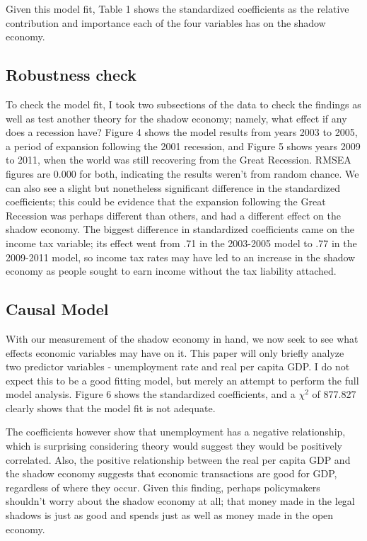 \documentclass[12pt]{report}
\begin{document}
Given this model fit, Table 1 shows the standardized coefficients as the relative contribution and importance each of the four variables has on the shadow economy. 

\subsection*{Robustness check}

To check the model fit, I took two subsections of the data to check the findings as well as test another theory for the shadow economy; namely, what effect if any does a recession have? Figure 4 shows the model results from years 2003 to 2005, a period of expansion following the 2001 recession, and Figure 5 shows years 2009 to 2011, when the world was still recovering from the Great Recession. RMSEA figures are 0.000 for both, indicating the results weren't from random chance. We can also see a slight but nonetheless significant difference in the standardized coefficients; this could be evidence that the expansion following the Great Recession was perhaps different than others, and had a different effect on the shadow economy. The biggest difference in standardized coefficients came on the income tax variable; its effect went from .71 in the 2003-2005 model to .77 in the 2009-2011 model, so income tax rates may have led to an increase in the shadow economy as people sought to earn income without the tax liability attached. 

\subsection*{Causal Model}

With our measurement of the shadow economy in hand, we now seek to see what effects economic variables may have on it. This paper will only briefly analyze two predictor variables - unemployment rate and real per capita GDP. I do not expect this to be a good fitting model, but merely an attempt to perform the full model analysis. Figure 6 shows the standardized coefficients, and a $\chi^2$ of 877.827 clearly shows that the model fit is not adequate. 

The coefficients however show that unemployment has a negative relationship, which is surprising considering theory would suggest they would be positively correlated. Also, the positive relationship between the real per capita GDP and the shadow economy suggests that economic transactions are good for GDP, regardless of where they occur. Given this finding, perhaps policymakers shouldn't worry about the shadow economy at all; that money made in the legal shadows is just as good and spends just as well as money made in the open economy.  
\end{document}

